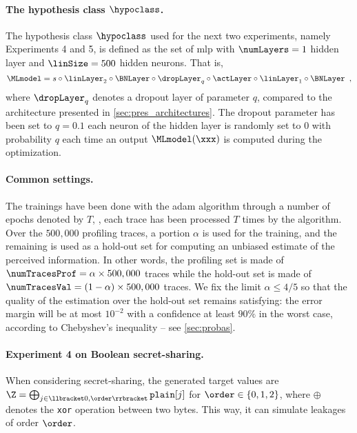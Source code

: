 \paragraph{The hypothesis class \(\hypoclass\).}
The hypothesis class \(\hypoclass\) used for the next two experiments, namely Experiments 4 and 5, is defined as the set of \gls{mlp} with \(\numLayers=1\) hidden layer and \(\linSize = 500\) hidden neurons.
That is,
\begin{equation}
    \MLmodel = s \circ \linLayer_2 \circ \BNLayer \circ
    \dropLayer_q \circ \actLayer \circ \linLayer_1 \circ \BNLayer \enspace ,
  \end{equation}
where \(\dropLayer_q\) denotes a dropout layer of parameter \(q\), compared to the architecture presented in \autoref{sec:pres_architectures}.
The dropout parameter has been set to \(q=0.1\) \ie{} each neuron of the hidden layer is randomly set to \(0\) with probability \(q\) each time an output \(\MLmodel(\xxx)\) is computed during the optimization.

\paragraph{Common settings.}
The trainings have been done with the \gls{adam} algorithm through a number of epochs denoted by \(T\), \ie{}, each trace has been processed \(T\) times by the algorithm. 
Over the \(500,000\) profiling traces, a portion \(\alpha\) is used for the training, and the remaining is used as a hold-out set for computing an unbiased estimate of the perceived information. 
In other words, the profiling set is made of \(\numTracesProf = \alpha \times 500, 000\) traces while the hold-out set is made of \(\numTracesVal = (1 - \alpha) \times 500,000\) traces.
We fix the limit \(\alpha \leq 4/5\) so that the quality of the estimation over the hold-out set remains satisfying: the error margin will be at most \(10^{-2}\) with a confidence at least \(90 \%\) in the worst case, according to Chebyshev's inequality -- see \autoref{sec:probas}.


\paragraph{Experiment 4 on Boolean secret-sharing.}
When considering secret-sharing, the generated target values are \(\Z = \bigoplus_{j \in \llbracket 0, \order \rrbracket} \verb+plain+[j]\) for \(\order \in \{0, 1, 2\}\), where \(\oplus\) denotes the \verb+xor+ operation between two bytes. 
This way, it can simulate leakages of order \(\order\).

